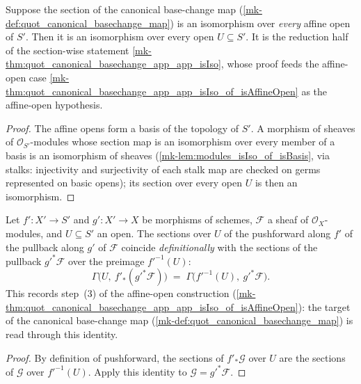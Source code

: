 \begin{theorem}\label{mk-thm:quot_canonical_basechange_app_app_isIso_of_affineCover}
  \leanok

  Suppose the section of the canonical base-change map
  (\ref{mk-def:quot_canonical_basechange_map}) is an isomorphism over
  \emph{every} affine open of \(S'\). Then it is an isomorphism over every
  open \(U \subseteq S'\). It is the reduction half of the section-wise
  statement \ref{mk-thm:quot_canonical_basechange_app_app_isIso}, whose proof
  feeds the affine-open case
  \ref{mk-thm:quot_canonical_basechange_app_app_isIso_of_isAffineOpen} as the
  affine-open hypothesis.
\end{theorem}
\begin{proof}
  \leanok{}
  The affine opens form a basis of the topology of \(S'\). A morphism of
  sheaves of \(\mathcal O_{S'}\)-modules whose section map is an
  isomorphism over every member of a basis is an isomorphism of sheaves
  (\ref{mk-lem:modules_isIso_of_isBasis}, via stalks: injectivity and
  surjectivity of each stalk map are checked on germs represented on basic
  opens); its section over every open \(U\) is then an isomorphism.
\end{proof}

\begin{lemma}\label{mk-lem:quot_pushforward_pullback_section_eq}
  \leanok

  Let \(f' : X' \to S'\) and \(g' : X' \to X\) be morphisms of schemes,
  \(\mathcal{F}\) a sheaf of \(\mathcal{O}_X\)-modules, and \(U \subseteq S'\)
  an open. The sections over \(U\) of the pushforward along \(f'\) of the
  pullback along \(g'\) of \(\mathcal{F}\) coincide \emph{definitionally}
  with the sections of the pullback \(g'^* \mathcal{F}\) over the preimage
  \(f'^{-1}(U)\):
  \[
    \Gamma\bigl(U,\ f'_* (g'^* \mathcal{F})\bigr)
    \;=\;
    \Gamma\bigl(f'^{-1}(U),\ g'^* \mathcal{F}\bigr).
  \]
  This records step~(3) of the affine-open construction
  (\ref{mk-thm:quot_canonical_basechange_app_app_isIso_of_isAffineOpen}): the
  target of the canonical base-change map
  (\ref{mk-def:quot_canonical_basechange_map}) is read through this identity.
\end{lemma}
\begin{proof}
  By definition of pushforward, the sections of \(f'_*\mathcal G\) over
  \(U\) are the sections of \(\mathcal G\) over \(f'^{-1}(U)\). Apply this
  identity to \(\mathcal G=g'^*\mathcal F\).
\end{proof}

